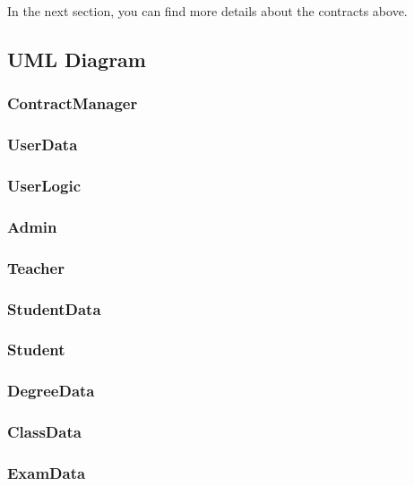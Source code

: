 In the next section, you can find more details about the contracts above.

\subsection{UML Diagram}

\subsubsection{ContractManager}

\subsubsection{UserData}

\subsubsection{UserLogic}

\subsubsection{Admin}

\subsubsection{Teacher}

\subsubsection{StudentData}

\subsubsection{Student}

\subsubsection{DegreeData}

\subsubsection{ClassData}

\subsubsection{ExamData}

